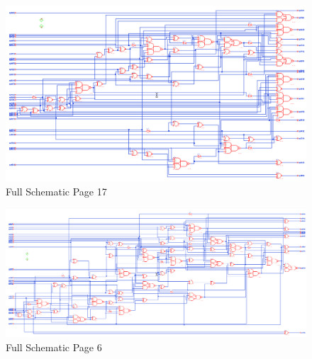 \documentclass[11pt]{article}
\begin{document}
	
	\begin{figure}[H] 
		\centering 
		\includegraphics[width=0.7\linewidth]{"Pictures/Full Schematic Page 17"}
		\caption{Full Schematic Page 17} 
		\label{fig:Full-Schematic-Page-17} 
	\end{figure}
	
	
	\begin{figure}[H] 
		\centering 
		\includegraphics[width=0.7\linewidth]{"Pictures/Full Schematic Page 6"}
		\caption{Full Schematic Page 6} 
		\label{fig:Full-Schematic-Page-6} 
	\end{figure}
	
\end{document}
